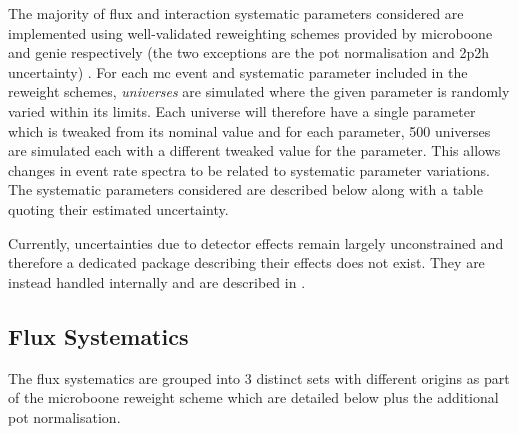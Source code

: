 The majority of flux and interaction systematic parameters considered are implemented using well-validated reweighting schemes provided by \gls{microboone} and \gls{genie} respectively (the two exceptions are the \gls{pot} normalisation and \gls{2p2h} uncertainty) \cite{BNB_flux}\cite{GENIE_manual}. For each \gls{mc} event and systematic parameter included in the reweight schemes, \textit{universes} are simulated where the given parameter is randomly varied within its limits. Each universe will therefore have a single parameter which is tweaked from its nominal value and for each parameter, 500 universes are simulated each with a different tweaked value for the parameter. This allows changes in event rate spectra to be related to systematic parameter variations. The systematic parameters considered are described below along with a table quoting their estimated uncertainty. 

Currently, uncertainties due to detector effects remain largely unconstrained and therefore a dedicated package describing their effects does not exist. They are instead handled internally and are described in . 


\subsection{Flux Systematics}\label{sec:flux_syst}

The flux systematics are grouped into 3 distinct sets with different origins as part of the \gls{microboone} reweight scheme which are detailed below plus the additional \gls{pot} normalisation. 

